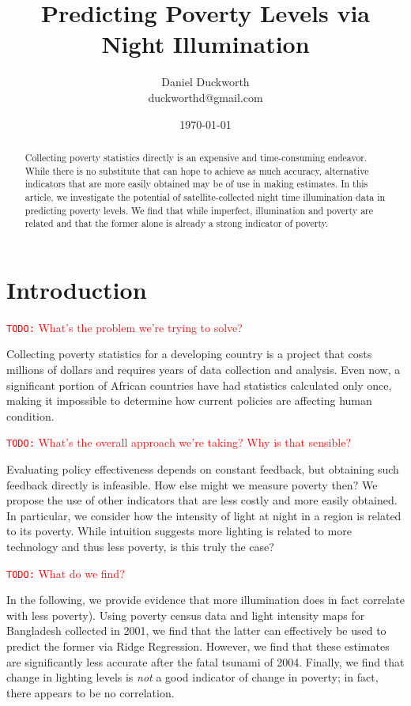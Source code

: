 \documentclass[10pt, letterpaper]{article}
\author{
	Daniel Duckworth \\
	duckworthd@gmail.com
}
\title{Predicting Poverty Levels via Night Illumination}
\date{\today}
\theoremstyle{plain}
\theoremstyle{definition}
\newcommand{\todo}[1]{
	\textcolor{red}{\texttt{TODO:} #1}
}
\begin{document}
\maketitle

\begin{abstract}
	Collecting poverty statistics directly is an expensive and time-consuming endeavor. While there is no substitute that can hope to achieve as much accuracy, alternative indicators that are more easily obtained may be of use in making estimates. In this article, we investigate the potential of satellite-collected night time illumination data in predicting poverty levels. We find that while imperfect, illumination and poverty are related and that the former alone is already a strong indicator of poverty.
\end{abstract}

\section{Introduction}

\todo{What's the problem we're trying to solve?}

  Collecting poverty statistics for a developing country is a project that costs millions of dollars and requires years of data collection and analysis. Even now, a significant portion of African countries have had statistics calculated only once, making it impossible to determine how current policies are affecting human condition.

\todo{What's the overall approach we're taking? Why is that sensible?}

  Evaluating policy effectiveness depends on constant feedback, but obtaining such feedback directly is infeasible. How else might we measure poverty then?  We propose the use of other indicators that are less costly and more easily obtained. In particular, we consider how the intensity of light at night in a region is related to its poverty.  While intuition suggests more lighting is related to more technology and thus less poverty, is this truly the case?

\todo{What do we find?}

  In the following, we provide evidence that more illumination does in fact correlate with less poverty).  Using poverty census data and light intensity maps for Bangladesh collected in 2001, we find that the latter can effectively be used to predict the former via Ridge Regression. However, we find that these estimates are significantly less accurate after the fatal tsunami of 2004. Finally, we find that change in lighting levels is \textit{not} a good indicator of change in poverty; in fact, there appears to be no correlation.
    
\end{document}

